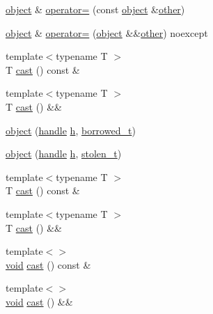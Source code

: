\begin{DoxyCompactItemize}
\mbox{\hyperlink{classobject}{object}} \& \mbox{\hyperlink{classobject_a77c0e831678400d37745600204f85e14}{operator=}} (const \mbox{\hyperlink{classobject}{object}} \&\mbox{\hyperlink{dictobject_8h_abd4733e17e86acb453bda62bc8b96adf}{other}})
\item 
\mbox{\hyperlink{classobject}{object}} \& \mbox{\hyperlink{classobject_a3f06d0eea159fe5bc18a96483a7438f2}{operator=}} (\mbox{\hyperlink{classobject}{object}} \&\&\mbox{\hyperlink{dictobject_8h_abd4733e17e86acb453bda62bc8b96adf}{other}}) noexcept
\item 
{\footnotesize template$<$typename T $>$ }\\T \mbox{\hyperlink{classobject_acf93eb705d6539ef22e2c4a8eebc4c68}{cast}} () const \&
\item 
{\footnotesize template$<$typename T $>$ }\\T \mbox{\hyperlink{classobject_a213e60c515e4e3273967df63e06db4e3}{cast}} () \&\&
\item 
\mbox{\hyperlink{classobject_ad2db8259e6e585a4b61b9a9a9627b7f0}{object}} (\mbox{\hyperlink{classhandle}{handle}} \mbox{\hyperlink{_s_d_l__opengl__glext_8h_afa0fb1b5e976920c0abeff2dca3ed774}{h}}, \mbox{\hyperlink{structobject_1_1borrowed__t}{borrowed\+\_\+t}})
\item 
\mbox{\hyperlink{classobject_a8202a0f0f7fe12a68d8d5fb18e766b07}{object}} (\mbox{\hyperlink{classhandle}{handle}} \mbox{\hyperlink{_s_d_l__opengl__glext_8h_afa0fb1b5e976920c0abeff2dca3ed774}{h}}, \mbox{\hyperlink{structobject_1_1stolen__t}{stolen\+\_\+t}})
\item 
{\footnotesize template$<$typename T $>$ }\\T \mbox{\hyperlink{classobject_acf93eb705d6539ef22e2c4a8eebc4c68}{cast}} () const \&
\item 
{\footnotesize template$<$typename T $>$ }\\T \mbox{\hyperlink{classobject_a213e60c515e4e3273967df63e06db4e3}{cast}} () \&\&
\item 
{\footnotesize template$<$$>$ }\\\mbox{\hyperlink{_s_d_l__opengles2__gl2ext_8h_ae5d8fa23ad07c48bb609509eae494c95}{void}} \mbox{\hyperlink{classobject_a4f5464fb468d2c0603780a7e3f4a2e80}{cast}} () const \&
\item 
{\footnotesize template$<$$>$ }\\\mbox{\hyperlink{_s_d_l__opengles2__gl2ext_8h_ae5d8fa23ad07c48bb609509eae494c95}{void}} \mbox{\hyperlink{classobject_a7646c5ad0fba1cd9c20329807678627c}{cast}} () \&\&
\end{DoxyCompactItemize}
